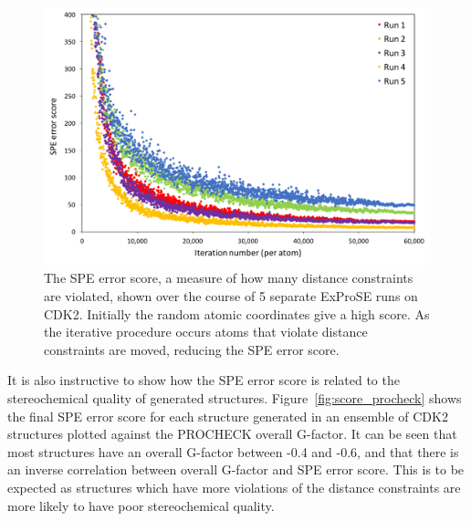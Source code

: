\begin{figure}
\centering

\includegraphics[width=\textwidth]{figures/spe_convergence/spe_convergence}

\caption[Convergence of the ExProSE SPE error score for 5 separate runs on CDK2]
{The SPE error score, a measure of how many distance constraints are violated, shown over the course of 5 separate ExProSE runs on CDK2.
Initially the random atomic coordinates give a high score.
As the iterative procedure occurs atoms that violate distance constraints are moved, reducing the SPE error score.}

\label{fig:spe_convergence}
\end{figure}


It is also instructive to show how the SPE error score is related to the stereochemical quality of generated structures.
Figure~\ref{fig:score_procheck} shows the final SPE error score for each structure generated in an ensemble of CDK2 structures plotted against the PROCHECK overall G-factor.
It can be seen that most structures have an overall G-factor between -0.4 and -0.6, and that there is an inverse correlation between overall G-factor and SPE error score.
This is to be expected as structures which have more violations of the distance constraints are more likely to have poor stereochemical quality.


